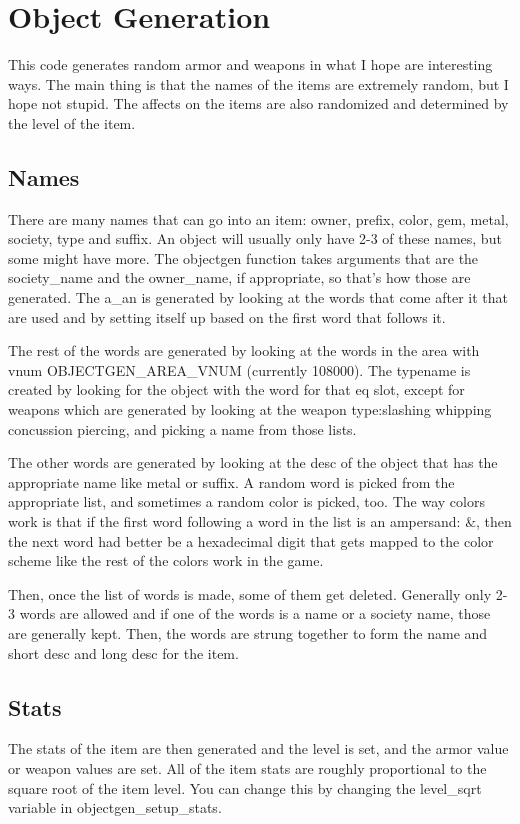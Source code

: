 \chapter{Object Generation}


This code generates random armor and weapons in what I hope are
interesting ways. The main thing is that the names of the items
are extremely random, but I hope not stupid. The affects on the
items are also randomized and determined by the level of the item.

\section{Names}

There are many names that can go into an item: owner, prefix, color, gem,
metal, society, type and suffix. An object will usually only have 2-3 of these
names, but some might have more. The objectgen function takes arguments that
are the society\_name and the owner\_name, if appropriate, so that's how
those are generated. The a\_an is generated by looking at the words that
come after it that are used and by setting itself up based on the 
first word that follows it.

The rest of the words are generated by looking at the words in the area with
vnum OBJECTGEN\_AREA\_VNUM (currently 108000). The typename is created
by looking for the object with the word for that eq slot, except for
weapons which are generated by looking at the weapon type:slashing whipping
concussion piercing, and picking a name from those lists.

The other words are generated by looking at the desc of the object
that has the appropriate name like metal or suffix. A random word is
picked from the appropriate list, and sometimes a random color is
picked, too. The way colors work is that if the first word following
a word in the list is an ampersand: $\&$, then the next word had
better be a hexadecimal digit that gets mapped to the color scheme like
the rest of the colors work in the game.

Then, once the list of words is made, some of them get deleted. Generally
only 2-3 words are allowed and if one of the words is a name or a
society name, those are generally kept. Then, the words are strung
together to form the name and short desc and long desc for the item.

\section{Stats}
The stats of the item are then generated and the level is set, and the
armor value or weapon values are set. All of the item stats are roughly
proportional to the square root of the item level. You can change this
by changing the level\_sqrt variable in objectgen\_setup\_stats.

